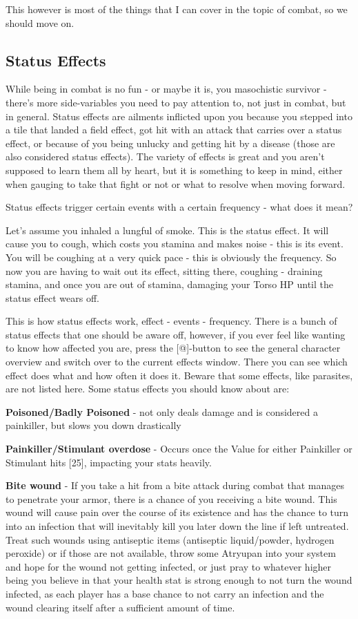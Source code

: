 This however is most of the things that I can cover in the topic of combat, so we should move on.

\subsection{Status Effects}

While being in combat is no fun - or maybe it is, you masochistic survivor - there's more side-variables you need to pay attention to, not just in combat, but in general. Status effects are ailments inflicted upon you because you stepped into a tile that landed a field effect, got hit with an attack that carries over a status effect, or because of you being unlucky and getting hit by a disease (those are also considered status effects). The variety of effects is great and you aren't supposed to learn them all by heart, but it is something to keep in mind, either when gauging to take that fight or not or what to resolve when moving forward.

Status effects trigger certain events with a certain frequency - what does it mean?

Let's assume you inhaled a lungful of smoke. This is the status effect. It will cause you to cough, which costs you stamina and makes noise - this is its event. You will be coughing at a very quick pace - this is obviously the frequency. So now you are having to wait out its effect, sitting there, coughing - draining stamina, and once you are out of stamina, damaging your Torso HP until the status effect wears off.

This is how status effects work, effect - events - frequency. There is a bunch of status effects that one should be aware off, however, if you ever feel like wanting to know how affected you are, press the [@]-button to see the general character overview and switch over to the current effects window. There you can see which effect does what and how often it does it. Beware that some effects, like parasites, are not listed here. Some status effects you should know about are:

\textbf{Poisoned/Badly Poisoned} - not only deals damage and is considered a painkiller, but slows you down drastically

\textbf{Painkiller/Stimulant overdose} - Occurs once the Value for either Painkiller or Stimulant hits [25], impacting your stats heavily.

\textbf{Bite wound} - If you take a hit from a bite attack during combat that manages to penetrate your armor, there is a chance of you receiving a bite wound. This wound will cause pain over the course of its existence and has the chance to turn into an infection that will inevitably kill you later down the line if left untreated. Treat such wounds using antiseptic items (antiseptic liquid/powder, hydrogen peroxide) or if those are not available, throw some Atryupan into your system and hope for the wound not getting infected, or just pray to whatever higher being you believe in that your health stat is strong enough to not turn the wound infected, as each player has a base chance to not carry an infection and the wound clearing itself after a sufficient amount of time.

